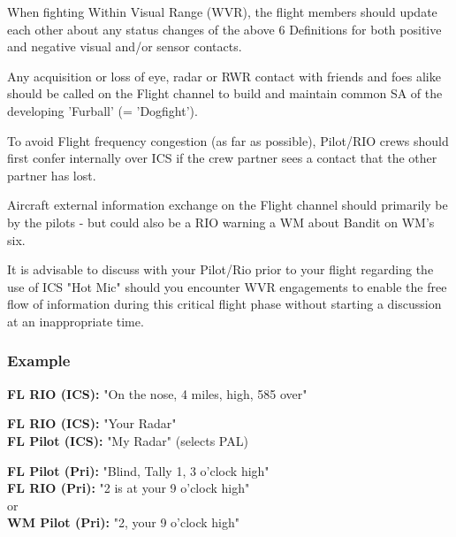 When fighting Within Visual Range (WVR), the flight members should update each
other about any status changes of the above 6 Definitions for both positive and
negative visual and/or sensor contacts.

Any acquisition or loss of eye, radar or RWR contact with friends and foes
alike should be called on the Flight channel to build and maintain common SA of
the developing 'Furball' (= 'Dogfight').

To avoid Flight frequency congestion (as far as possible), Pilot/RIO crews
should first confer internally over ICS if the crew partner sees a contact that
the other partner has lost.

Aircraft external information exchange on the Flight channel should primarily
be by the pilots - but could also be a RIO warning a WM about Bandit on WM's
six.

It is advisable to discuss with your Pilot/Rio prior to your flight regarding
the use of ICS "Hot Mic" should you encounter WVR engagements to enable the
free flow of information during this critical flight phase without starting a
discussion at an inappropriate time.

\subsubsection*{Example}


\textbf{FL RIO (ICS):} "On the nose, 4 miles, high, 585 over"

\textbf{FL RIO (ICS):} "Your Radar"\\
\textbf{FL Pilot (ICS):} "My Radar" (selects PAL)

\textbf{FL Pilot (Pri):} "Blind, Tally 1, 3 o'clock high"\\
\textbf{FL RIO (Pri):} "2 is at your 9 o'clock high" \\
or \\
\textbf{WM Pilot (Pri):} "2, your 9 o'clock high"
